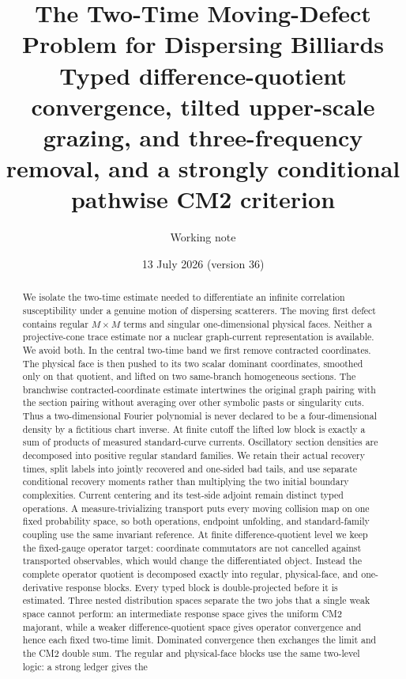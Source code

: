 \documentclass[11pt]{article}
\title{The Two-Time Moving-Defect Problem for Dispersing Billiards\\
\large Typed difference-quotient convergence, tilted upper-scale grazing, and three-frequency removal,
and a strongly conditional
pathwise CM2 criterion}
\author{Working note}
\date{13 July 2026 (version 36)}
\begin{document}
\maketitle

\begin{abstract}
We isolate the two-time estimate needed to differentiate an infinite
correlation susceptibility under a genuine motion of dispersing scatterers.
The moving first defect contains regular $M\times M$ terms and singular
one-dimensional physical faces.  Neither a projective-cone trace estimate nor
a nuclear graph-current representation is available.  We avoid both.  In the
central two-time band we first remove contracted coordinates.  The physical
face is then pushed to its two scalar dominant coordinates, smoothed only on
that quotient, and lifted on two same-branch homogeneous sections.  The
branchwise contracted-coordinate estimate intertwines the original graph
pairing with the section pairing without averaging over other symbolic pasts
or singularity cuts.  Thus a two-dimensional Fourier polynomial is never
declared to be a four-dimensional density by a fictitious chart inverse.  At
finite cutoff the lifted low block is exactly a sum of products of measured
standard-curve currents.  Oscillatory section densities are decomposed into
positive regular standard families.  We retain their actual recovery times,
split labels into jointly recovered and one-sided bad tails, and use separate
conditional recovery moments rather than multiplying the two initial boundary
complexities.  Current centering and its test-side adjoint remain
distinct typed operations.  A measure-trivializing transport puts every
moving collision map on one fixed probability space, so both operations,
endpoint unfolding, and standard-family coupling use the same invariant
reference.  At finite difference-quotient level we keep the fixed-gauge
operator target: coordinate commutators are not cancelled against transported
observables, which would change the differentiated object.  Instead the
complete operator quotient is decomposed exactly into regular, physical-face,
and one-derivative response blocks.  Every typed block is double-projected
before it is estimated.  Three nested distribution spaces separate the two
jobs that a single weak space cannot perform: an intermediate response space
gives the uniform CM2 majorant, while a weaker difference-quotient space gives
operator convergence and hence each fixed two-time limit.  Dominated
convergence then exchanges the limit and the CM2 double sum.  The regular and
physical-face blocks use the same two-level logic: a strong ledger gives the

\end{abstract}
\end{document}
